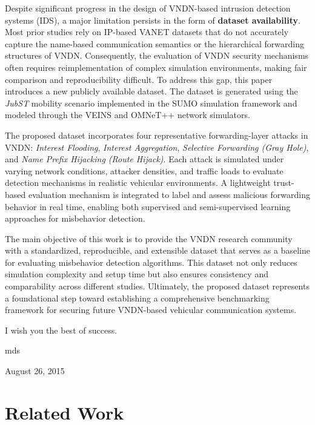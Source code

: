 \documentclass[journal,comsoc]{IEEEtran}
\begin{document}
Despite significant progress in the design of VNDN-based intrusion detection systems (IDS), a major limitation persists in the form of \textbf{dataset availability}. Most prior studies rely on IP-based VANET datasets that do not accurately capture the name-based communication semantics or the hierarchical forwarding structures of VNDN. Consequently, the evaluation of VNDN security mechanisms often requires reimplementation of complex simulation environments, making fair comparison and reproducibility difficult. To address this gap, this paper introduces a new publicly available dataset. The dataset is generated using the \textit{JubST} mobility scenario implemented in the SUMO simulation framework and modeled through the VEINS and OMNeT++ network simulators.

The proposed dataset incorporates four representative forwarding-layer attacks in VNDN: \textit{Interest Flooding}, \textit{Interest Aggregation}, \textit{Selective Forwarding (Gray Hole)}, and \textit{Name Prefix Hijacking (Route Hijack)}. Each attack is simulated under varying network conditions, attacker densities, and traffic loads to evaluate detection mechanisms in realistic vehicular environments. A lightweight trust-based evaluation mechanism is integrated to label and assess malicious forwarding behavior in real time, enabling both supervised and semi-supervised learning approaches for misbehavior detection. 

The main objective of this work is to provide the VNDN research community with a standardized, reproducible, and extensible dataset that serves as a baseline for evaluating misbehavior detection algorithms. This dataset not only reduces simulation complexity and setup time but also ensures consistency and comparability across different studies. Ultimately, the proposed dataset represents a foundational step toward establishing a comprehensive benchmarking framework for securing future VNDN-based vehicular communication systems.

I wish you the best of success.

\hfill mds
 
\hfill August 26, 2015



\section{Related Work}
\label{related:2}
\end{document}
